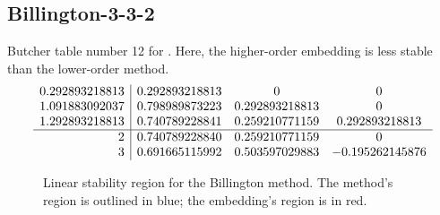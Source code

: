 \documentclass[letterpaper,10pt,english]{sphinxmanual}
\begin{document}
\subsection{Billington-3-3-2}
\label{Butcher:butcher-billington}\label{Butcher:billington-3-3-2}
Butcher table number 12
for {\hyperref[c_interface/User_callable:c.ARKodeSetIRKTableNum]{\emph{}}}.  Here, the
higher-order embedding is less stable than the lower-order method.
\begin{gather}
\begin{split}\begin{array}{r|ccc}
  0.292893218813 & 0.292893218813 & 0 & 0 \\
  1.091883092037 & 0.798989873223 & 0.292893218813 & 0 \\
  1.292893218813 & 0.740789228841 & 0.259210771159 & 0.292893218813 \\
  \hline
  2 & 0.740789228840 & 0.259210771159 & 0 \\
  3 & 0.691665115992 & 0.503597029883 & -0.195262145876
\end{array}\end{split}\notag
\end{gather}\begin{figure}[htbp]
\centering
\capstart

\caption{Linear stability region for the Billington method.  The method's
region is outlined in blue; the embedding's region is in red.}\end{figure}
\end{document}
